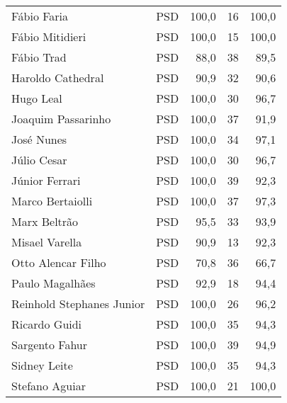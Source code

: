 \begin{longtable}{llrrr}
                         Fábio Faria &            PSD &     100,0 &           16 &      100,0 \\
                     Fábio Mitidieri &            PSD &     100,0 &           15 &      100,0 \\
                          Fábio Trad &            PSD &      88,0 &           38 &       89,5 \\
                   Haroldo Cathedral &            PSD &      90,9 &           32 &       90,6 \\
                           Hugo Leal &            PSD &     100,0 &           30 &       96,7 \\
                  Joaquim Passarinho &            PSD &     100,0 &           37 &       91,9 \\
                          José Nunes &            PSD &     100,0 &           34 &       97,1 \\
                         Júlio Cesar &            PSD &     100,0 &           30 &       96,7 \\
                      Júnior Ferrari &            PSD &     100,0 &           39 &       92,3 \\
                    Marco Bertaiolli &            PSD &     100,0 &           37 &       97,3 \\
                        Marx Beltrão &            PSD &      95,5 &           33 &       93,9 \\
                      Misael Varella &            PSD &      90,9 &           13 &       92,3 \\
                  Otto Alencar Filho &            PSD &      70,8 &           36 &       66,7 \\
                     Paulo Magalhães &            PSD &      92,9 &           18 &       94,4 \\
           Reinhold Stephanes Junior &            PSD &     100,0 &           26 &       96,2 \\
                       Ricardo Guidi &            PSD &     100,0 &           35 &       94,3 \\
                      Sargento Fahur &            PSD &     100,0 &           39 &       94,9 \\
                        Sidney Leite &            PSD &     100,0 &           35 &       94,3 \\
                      Stefano Aguiar &            PSD &     100,0 &           21 &      100,0 \\

\end{longtable}
